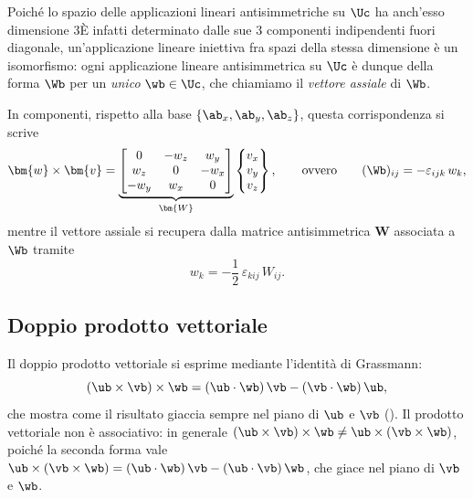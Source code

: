 	 Poiché lo spazio delle applicazioni lineari antisimmetriche su $\Uc$ ha anch'esso
dimensione $3${È infatti  determinato dalle sue $3$ componenti indipendenti fuori
diagonale}, un'applicazione lineare iniettiva fra spazi della stessa dimensione
è un isomorfismo: ogni applicazione lineare antisimmetrica  su $\Uc$ è dunque della
forma $\Wb$ per un \emph{unico} $\wb\in\Uc$, che chiamiamo il
\emph{vettore assiale} di $\Wb$.

In componenti, rispetto alla base $\{\ab_x,\ab_y,\ab_z\}$, questa corrispondenza
si scrive
\begin{equation}\label{eq:prod_vett_matrice}
	\bm{w} \times \bm{v}
	= \underbrace{\begin{bmatrix}
			0   & -w_z &  w_y \\
			w_z &  0   & -w_x \\
			-w_y &  w_x &  0
	\end{bmatrix}}_{\bm{W}}
	\begin{Bmatrix} v_x \\ v_y \\ v_z \end{Bmatrix},
	\qquad\text{ovvero}\qquad
	(\Wb)_{ij}=-\varepsilon_{ijk}\,w_k,
\end{equation}
mentre il vettore assiale si recupera dalla matrice antisimmetrica $\bm{W}$ associata a  $\Wb$
tramite
\begin{equation}\label{eq:vettore_assiale_da_tensore}
	w_k=-\frac12\,\varepsilon_{kij}\,W_{ij}.
\end{equation}



\subsection{Doppio prodotto vettoriale}

Il doppio prodotto vettoriale si esprime mediante l'identità di Grassmann:
\begin{equation}\label{eq:doppio_vett}
	(\ub \times \vb) \times \wb	= (\ub \cdot \wb)\,\vb - (\vb \cdot \wb)\,\ub,
\end{equation}
che mostra come il risultato giaccia sempre nel piano di $\ub$ e $\vb$
(). Il prodotto vettoriale non è
associativo: in generale
$(\ub \times \vb) \times \wb \neq \ub \times (\vb \times \wb)$,
poiché la seconda forma vale
$\ub \times (\vb \times \wb) = (\ub \cdot \wb)\,\vb - (\ub \cdot \vb)\,\wb$,
che giace nel piano di $\vb$ e $\wb$.


